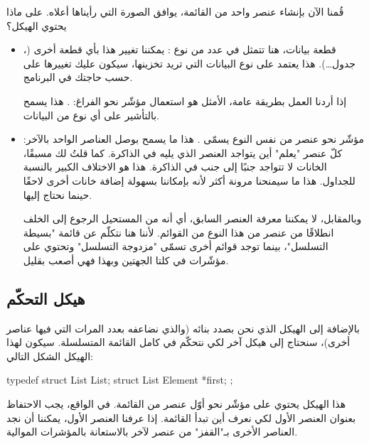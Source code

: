 قُمنا الآن بإنشاء عنصر واحد من القائمة، يوافق الصورة التي رأيناها أعلاه. على ماذا يحتوي الهيكل؟

\begin{itemize}
	\item قطعة بيانات، هنا تتمثل في عدد من نوع 
	:
	يمكننا تغيير هذا بأي قطعة أخرى
	(،
	جدول\dots). هذا يعتمد على نوع البيانات التي تريد تخزينها، سيكون عليك تغييرها على حسب حاجتك في البرنامج.
	
	\begin{information}
		إذا أردنا العمل بطريقة عامة، الأمثل هو استعمال مؤشّر نحو الفراغ:
		.
		هذا يسمح بالتأشير على أي نوع من البيانات.
	\end{information}
	\item مؤشّر نحو عنصر من نفس النوع يسمّى
	\InlineCode{next}.
	هذا ما يسمح بوصل العناصر الواحد بالآخر: كلّ عنصر "يعلم" أين يتواجد العنصر الذي يليه في الذاكرة. كما قلتُ لك مسبقًا، الخانات لا تتواجد جنبًا إلى جنب في الذاكرة. هذا هو الاختلاف الكبير بالنسبة للجداول. هذا ما سيمنحنا مرونة أكثر لأنه بإمكاننا بسهولة إضافة خانات أخرى لاحقًا حينما نحتاج إليها.

\begin{information}
	وبالمقابل، لا يمكننا معرفة العنصر السابق، أي أنه من المستحيل الرجوع إلى الخلف انطلاقًا من عنصر من هذا النوع من القوائم. لأننا هنا نتكلّم عن قائمة "بسيطة التسلسل"، بينما توجد قوائم أخرى تسمّى "مزدوجة التسلسل" وتحتوي على مؤشّرات في كلتا الجهتين وبهذا فهي أصعب بقليل.
\end{information}
\end{itemize}


\subsection{هيكل التحكّم}

بالإضافة إلى الهيكل الذي نحن بصدد بنائه (والذي نضاعفه بعدد المرات التي فيها عناصر أخرى)، سنحتاج إلى هيكل آخر لكي نتحكّم في كامل القائمة المتسلسلة. سيكون لهذا الهيكل الشكل التالي:

\begin{Csource}
typedef struct List List;
struct List
{
	Element *first;
};
\end{Csource}

هذا الهيكل
يحتوي على مؤشّر نحو أوّل عنصر من القائمة. في الواقع، يجب الاحتفاظ بعنوان العنصر الأول لكي نعرف أين تبدأ القائمة. إذا عرفنا العنصر الأول، يمكننا أن نجد العناصر الأخرى بـ"القفز" من عنصر لآخر بالاستعانة بالمؤشرات الموالية.

